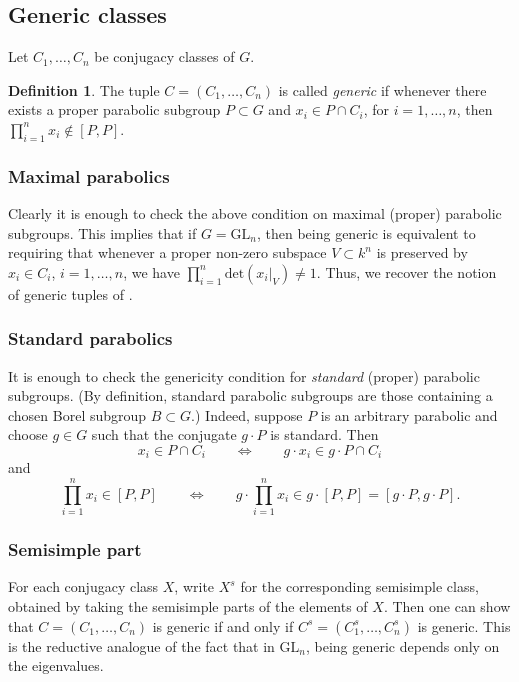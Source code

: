 \documentclass[12pt]{amsart}
\theoremstyle{plain}
\theoremstyle{definition}
\newtheorem{defe}[thm]{Definition}
\theoremstyle{remark}
\def\det{\mathrm{det}}  \def\Ker{\text{Ker}}  \def\wh{\widehat}
\newcommand{\GL}{\mathrm{GL}}
\begin{document}
\subsection{Generic classes} \label{s:generic}  Let $C_1,\ldots,C_n$ be conjugacy classes of $G$. 

\begin{defe}
The tuple $C=(C_1,\ldots, C_n)$ is called \emph{generic} if whenever there exists a proper parabolic subgroup $P\subset G$ and $x_i\in P\cap C_i$,  for $i=1,\ldots,n$, then  $\prod_{i=1}^n x_i\notin [P,P]$. 
\end{defe} 

\subsubsection{Maximal parabolics} 
Clearly it is enough to check the above condition on maximal (proper) parabolic subgroups. This implies that if $G=\GL_n$, then being generic is equivalent to requiring that whenever a proper non-zero subspace $V\subset k^n$ is preserved by $x_i\in C_i$, $i=1,\ldots,n$, we have  $\prod_{i=1}^n \det(x_i|_V)\neq 1$. Thus, we recover the notion of generic tuples of \cite[\S 2]{HLRV11}.  

\subsubsection{Standard parabolics} It is enough to check the genericity condition for \emph{standard} (proper) parabolic  subgroups. (By definition, standard parabolic subgroups are those containing a chosen Borel subgroup $B\subset G$.) Indeed, suppose $P$ is an arbitrary parabolic and choose $g \in G$ such that the conjugate $g\cdot P$ is standard. Then 
\[
x_i\in P\cap C_i\qquad \iff \qquad g\cdot x_i\in g\cdot P\cap C_i
\]
 and  
 \[
 \prod_{i=1}^n x_i\in [P,P]\qquad \iff \qquad g\cdot \prod_{i=1}^n x_i\in g\cdot [P,P]=[g\cdot P, g\cdot P].
 \] 

\subsubsection{Semisimple part}  For each conjugacy class $X$,  write $X^s$ for the corresponding semisimple class, obtained by taking the semisimple parts of the elements of $X$. 
Then one can show that $C=(C_1,\ldots,C_n)$ is generic if and only if $C^s=(C_1^s, \ldots, C_n^s)$ is generic. This is the reductive analogue of the fact that in $\GL_n$, being generic depends only on the eigenvalues.
\end{document}
